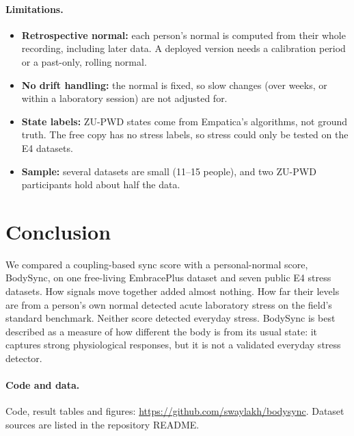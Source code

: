 \documentclass{article}
\begin{document}
\paragraph{Limitations.}
\begin{itemize}
\item \textbf{Retrospective normal:} each person's normal is computed from their whole recording, including later data. A deployed version needs a calibration period or a past-only, rolling normal.
\item \textbf{No drift handling:} the normal is fixed, so slow changes (over weeks, or within a laboratory session) are not adjusted for.
\item \textbf{State labels:} ZU-PWD states come from Empatica's algorithms, not ground truth. The free copy has no stress labels, so stress could only be tested on the E4 datasets.
\item \textbf{Sample:} several datasets are small (11--15 people), and two ZU-PWD participants hold about half the data.
\end{itemize}

\section{Conclusion}

We compared a coupling-based sync score with a personal-normal score, BodySync, on one free-living EmbracePlus dataset and seven public E4 stress datasets. How signals move together added almost nothing. How far their levels are from a person's own normal detected acute laboratory stress on the field's standard benchmark. Neither score detected everyday stress. BodySync is best described as a measure of how different the body is from its usual state: it captures strong physiological responses, but it is not a validated everyday stress detector.

\paragraph{Code and data.} Code, result tables and figures: \url{https://github.com/swaylakh/bodysync}. Dataset sources are listed in the repository README.



\end{document}
